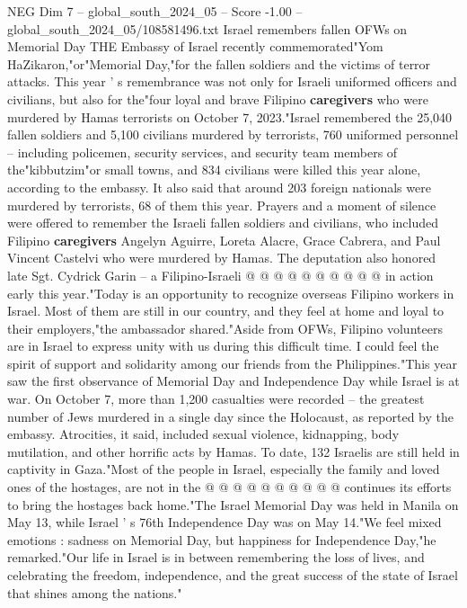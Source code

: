 \begin{textsample}{NEG Dim 7 – global\_south\_2024\_05 – Score -1.00 – global\_south\_2024\_05/108581496.txt}  \label{ex:f7_neg_243}
Israel remembers fallen OFWs on Memorial Day THE Embassy of Israel recently commemorated"Yom HaZikaron,"or"Memorial Day,"for the fallen soldiers and the victims of terror attacks.
This year ' s remembrance was not only for Israeli uniformed officers and civilians, but also for the"four loyal and brave Filipino \textbf{caregivers} who were murdered by Hamas terrorists on October 7, 2023."Israel remembered the 25,040 fallen soldiers and 5,100 civilians murdered by terrorists, 760 uniformed personnel -- including policemen, security services, and security team members of the"kibbutzim"or small towns, and 834 civilians were killed this year alone, according to the embassy.
It also said that around 203 foreign nationals were murdered by terrorists, 68 of them this year.
Prayers and a moment of silence were offered to remember the Israeli fallen soldiers and civilians, who included Filipino \textbf{caregivers} Angelyn Aguirre, Loreta Alacre, Grace Cabrera, and Paul Vincent Castelvi who were murdered by Hamas.
The deputation also honored late Sgt.
Cydrick Garin -- a Filipino-Israeli @ @ @ @ @ @ @ @ @ @ in action early this year."Today is an opportunity to recognize overseas Filipino workers in Israel.
Most of them are still in our country, and they feel at home and loyal to their employers,"the ambassador shared."Aside from OFWs, Filipino volunteers are in Israel to express unity with us during this difficult time.
I could feel the spirit of support and solidarity among our friends from the Philippines."This year saw the first observance of Memorial Day and Independence Day while Israel is at war.
On October 7, more than 1,200 casualties were recorded -- the greatest number of Jews murdered in a single day since the Holocaust, as reported by the embassy.
Atrocities, it said, included sexual violence, kidnapping, body mutilation, and other horrific acts by Hamas.
To date, 132 Israelis are still held in captivity in Gaza."Most of the people in Israel, especially the family and loved ones of the hostages, are not in the @ @ @ @ @ @ @ @ @ @ continues its efforts to bring the hostages back home."The Israel Memorial Day was held in Manila on May 13, while Israel ' s 76th Independence Day was on May 14."We feel mixed emotions : sadness on Memorial Day, but happiness for Independence Day,"he remarked."Our life in Israel is in between remembering the loss of lives, and celebrating the freedom, independence, and the great success of the state of Israel that shines among the nations."

\end{textsample}

